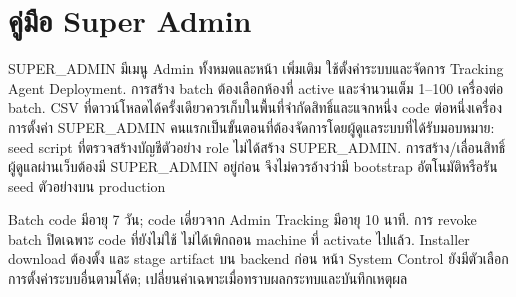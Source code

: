 \chapter{คู่มือ Super Admin}
SUPER\_ADMIN มีเมนู Admin ทั้งหมดและหน้า  เพิ่มเติม ใช้ตั้งค่าระบบและจัดการ Tracking Agent Deployment. การสร้าง batch ต้องเลือกห้องที่ active และจำนวนเต็ม 1--100 เครื่องต่อ batch. CSV ที่ดาวน์โหลดได้ครั้งเดียวควรเก็บในพื้นที่จำกัดสิทธิ์และแจกหนึ่ง code ต่อหนึ่งเครื่อง
การตั้งค่า SUPER\_ADMIN คนแรกเป็นขั้นตอนที่ต้องจัดการโดยผู้ดูแลระบบที่ได้รับมอบหมาย: seed script ที่ตรวจสร้างบัญชีตัวอย่าง role  ไม่ได้สร้าง SUPER\_ADMIN. การสร้าง/เลื่อนสิทธิ์ผู้ดูแลผ่านเว็บต้องมี SUPER\_ADMIN อยู่ก่อน จึงไม่ควรอ้างว่ามี bootstrap อัตโนมัติหรือรัน seed ตัวอย่างบน production
\begin{enumerate}
\end{enumerate}
Batch code มีอายุ 7 วัน; code เดี่ยวจาก Admin Tracking มีอายุ 10 นาที. การ revoke batch ปิดเฉพาะ code ที่ยังไม่ใช้ ไม่ได้เพิกถอน machine ที่ activate ไปแล้ว. Installer download ต้องตั้ง  และ stage artifact บน backend ก่อน หน้า System Control ยังมีตัวเลือกการตั้งค่าระบบอื่นตามโค้ด; เปลี่ยนค่าเฉพาะเมื่อทราบผลกระทบและบันทึกเหตุผล
